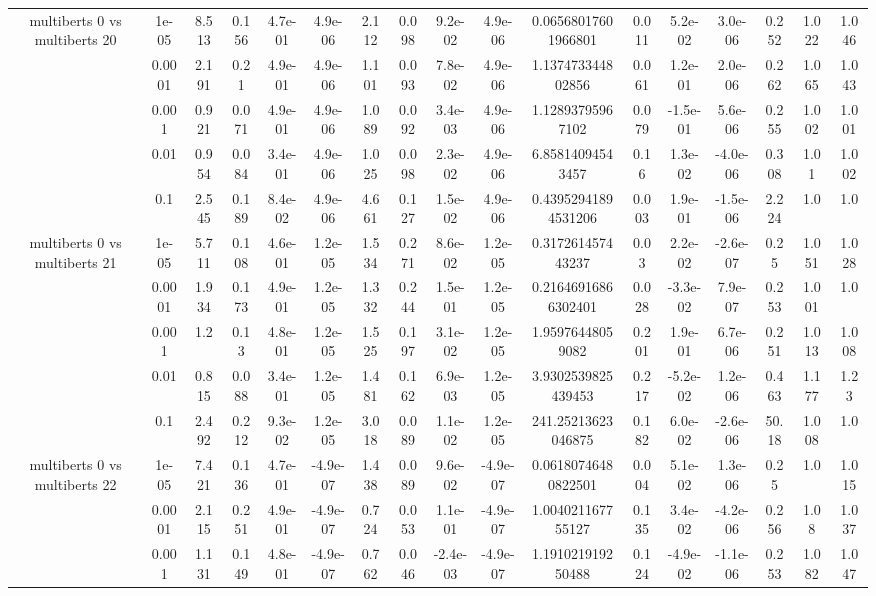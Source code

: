 \begin{tabular}{|c|c|c|c|c|c|c|c|c|c|c|c|c|c|c|c|c|}
\hline
\multirow{5}{*}{multiberts 0 vs multiberts 20} & 1e-05 & 8.513 & 0.156 & 4.7e-01 & 4.9e-06 & 2.112 & 0.098 & 9.2e-02 & 4.9e-06 & 0.06568017601966801 & 0.011 & 5.2e-02 & 3.0e-06 & 0.252 & 1.022 & 1.046 \\
 & 0.0001 & 2.191 & 0.21 & 4.9e-01 & 4.9e-06 & 1.101 & 0.093 & 7.8e-02 & 4.9e-06 & 1.137473344802856 & 0.061 & 1.2e-01 & 2.0e-06 & 0.262 & 1.065 & 1.043 \\
 & 0.001 & 0.921 & 0.071 & 4.9e-01 & 4.9e-06 & 1.089 & 0.092 & 3.4e-03 & 4.9e-06 & 1.12893795967102 & 0.079 & -1.5e-01 & 5.6e-06 & 0.255 & 1.002 & 1.001 \\
 & 0.01 & 0.954 & 0.084 & 3.4e-01 & 4.9e-06 & 1.025 & 0.098 & 2.3e-02 & 4.9e-06 & 6.85814094543457 & 0.16 & 1.3e-02 & -4.0e-06 & 0.308 & 1.01 & 1.002 \\
 & 0.1 & 2.545 & 0.189 & 8.4e-02 & 4.9e-06 & 4.661 & 0.127 & 1.5e-02 & 4.9e-06 & 0.43952941894531206 & 0.003 & 1.9e-01 & -1.5e-06 & 2.224 & 1.0 & 1.0 \\
\hline
\multirow{5}{*}{multiberts 0 vs multiberts 21} & 1e-05 & 5.711 & 0.108 & 4.6e-01 & 1.2e-05 & 1.534 & 0.271 & 8.6e-02 & 1.2e-05 & 0.317261457443237 & 0.03 & 2.2e-02 & -2.6e-07 & 0.25 & 1.051 & 1.028 \\
 & 0.0001 & 1.934 & 0.173 & 4.9e-01 & 1.2e-05 & 1.332 & 0.244 & 1.5e-01 & 1.2e-05 & 0.21646916866302401 & 0.028 & -3.3e-02 & 7.9e-07 & 0.253 & 1.001 & 1.0 \\
 & 0.001 & 1.2 & 0.13 & 4.8e-01 & 1.2e-05 & 1.525 & 0.197 & 3.1e-02 & 1.2e-05 & 1.95976448059082 & 0.201 & 1.9e-01 & 6.7e-06 & 0.251 & 1.013 & 1.008 \\
 & 0.01 & 0.815 & 0.088 & 3.4e-01 & 1.2e-05 & 1.481 & 0.162 & 6.9e-03 & 1.2e-05 & 3.9302539825439453 & 0.217 & -5.2e-02 & 1.2e-06 & 0.463 & 1.177 & 1.23 \\
 & 0.1 & 2.492 & 0.212 & 9.3e-02 & 1.2e-05 & 3.018 & 0.089 & 1.1e-02 & 1.2e-05 & 241.25213623046875 & 0.182 & 6.0e-02 & -2.6e-06 & 50.18 & 1.008 & 1.0 \\
\hline
\multirow{5}{*}{multiberts 0 vs multiberts 22} & 1e-05 & 7.421 & 0.136 & 4.7e-01 & -4.9e-07 & 1.438 & 0.089 & 9.6e-02 & -4.9e-07 & 0.06180746480822501 & 0.004 & 5.1e-02 & 1.3e-06 & 0.25 & 1.0 & 1.015 \\
 & 0.0001 & 2.115 & 0.251 & 4.9e-01 & -4.9e-07 & 0.724 & 0.053 & 1.1e-01 & -4.9e-07 & 1.004021167755127 & 0.135 & 3.4e-02 & -4.2e-06 & 0.256 & 1.08 & 1.037 \\
 & 0.001 & 1.131 & 0.149 & 4.8e-01 & -4.9e-07 & 0.762 & 0.046 & -2.4e-03 & -4.9e-07 & 1.191021919250488 & 0.124 & -4.9e-02 & -1.1e-06 & 0.253 & 1.082 & 1.047 \\

\end{tabular}
